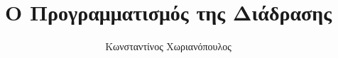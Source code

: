\documentclass[a4paper,11pt]{book}
\begin{document}
\title{Ο Προγραμματισμός της Διάδρασης}
\author{Κωνσταντίνος Χωριανόπουλος}


\frontmatter


 



\setcounter{secnumdepth}{1}
\setcounter{tocdepth}{1}
\tableofcontents





\mainmatter










\appendix

\end{document}
